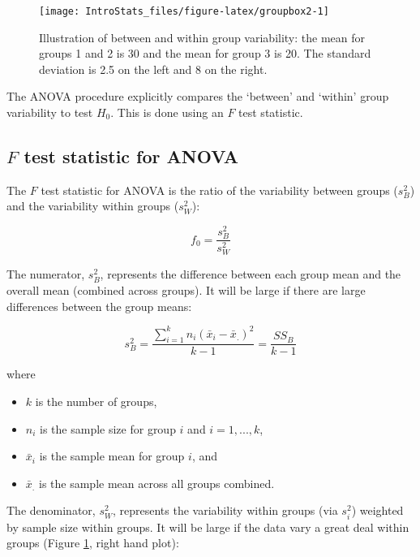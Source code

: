 \documentclass[
  oneside]{krantz}
\providecommand{\tightlist}{%
  \setlength{\itemsep}{0pt}\setlength{\parskip}{0pt}}
\begin{document}
\begin{figure}

{\centering \texttt{[image: IntroStats\_files/figure-latex/groupbox2-1]} 

}

\caption{Illustration of between and within group variability: the mean for groups 1 and 2 is 30 and the mean for group 3 is 20. The standard deviation is 2.5 on the left and 8 on the right.}\label{fig:groupbox2}
\end{figure}

The ANOVA procedure explicitly compares the `between' and `within' group variability to test \(H_0\). This is done using an \(F\) test statistic.

\hypertarget{f-test-statistic-for-anova}{%
\subsection{\texorpdfstring{\(F\) test statistic for ANOVA}{F test statistic for ANOVA}}\label{f-test-statistic-for-anova}}

The \(F\) test statistic for ANOVA is the ratio of the variability between groups (\(s_B^2\)) and the variability within groups (\(s_W^2\)):

\[f_0=\frac{s^2_B}{s^2_W}\]

The numerator, \(s^2_B\), represents the difference between each group mean and the overall mean (combined across groups). It will be large if there are large differences between the group means:

\[s^2_B=\frac{\sum_{i=1}^{k} n_i (\bar{x}_{i}-\bar{x}_{.})^2}{k-1}= \frac{SS_B}{k-1}\]

where

\begin{itemize}
\tightlist
\item
  \(k\) is the number of groups,
\item
  \(n_i\) is the sample size for group \(i\) and \(i=1, ..., k\),
\item
  \(\bar{x}_{i}\) is the sample mean for group \(i\), and
\item
  \(\bar{x}_{.}\) is the sample mean across all groups combined.
\end{itemize}

The denominator, \(s^2_W\), represents the variability within groups (via \(s^2_i\)) weighted by sample size within groups. It will be large if the data vary a great deal within groups (Figure \ref{fig:groupbox2}, right hand plot):
\end{document}

